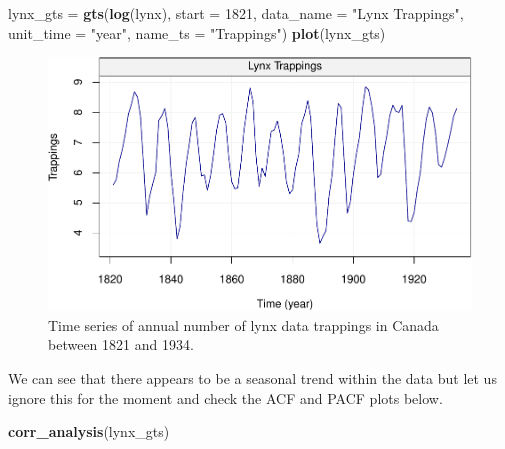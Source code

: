 \documentclass[]{book}
\newenvironment{Shaded}{\begin{snugshade}}{\end{snugshade}}
\newcommand{\KeywordTok}[1]{\textcolor[rgb]{0.13,0.29,0.53}{\textbf{#1}}}
\newcommand{\DataTypeTok}[1]{\textcolor[rgb]{0.13,0.29,0.53}{#1}}
\newcommand{\DecValTok}[1]{\textcolor[rgb]{0.00,0.00,0.81}{#1}}
\newcommand{\StringTok}[1]{\textcolor[rgb]{0.31,0.60,0.02}{#1}}
\newcommand{\NormalTok}[1]{#1}
\theoremstyle{definition}
\theoremstyle{definition}
\theoremstyle{definition}
\theoremstyle{remark}
\begin{document}
\begin{Shaded}
\begin{Highlighting}[]
\NormalTok{lynx_gts =}\StringTok{ }\KeywordTok{gts}\NormalTok{(}\KeywordTok{log}\NormalTok{(lynx), }\DataTypeTok{start =} \DecValTok{1821}\NormalTok{, }\DataTypeTok{data_name =} \StringTok{"Lynx Trappings"}\NormalTok{, }\DataTypeTok{unit_time =} \StringTok{"year"}\NormalTok{, }\DataTypeTok{name_ts =} \StringTok{"Trappings"}\NormalTok{)}
\KeywordTok{plot}\NormalTok{(lynx_gts)}
\end{Highlighting}
\end{Shaded}

\begin{figure}

{\centering \includegraphics{ts_files/figure-latex/unnamed-chunk-46-1} 

}

\caption{Time series of annual number of lynx data trappings in Canada between 1821 and 1934.}\label{fig:unnamed-chunk-46}
\end{figure}

We can see that there appears to be a seasonal trend within the data but
let us ignore this for the moment and check the ACF and PACF plots
below.

\begin{Shaded}
\begin{Highlighting}[]
\KeywordTok{corr_analysis}\NormalTok{(lynx_gts)}
\end{Highlighting}
\end{Shaded}
\end{document}
